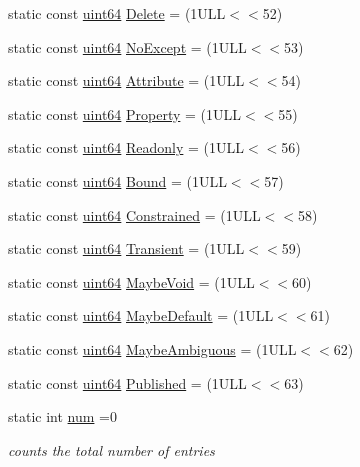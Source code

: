 \begin{DoxyCompactItemize}
\item 
static const \hyperlink{qglobal_8h_a29940ae63ec06c9998bba873e25407ad}{uint64} \hyperlink{class_entry_a7acc394a520d7dbc506a434baa11b2ff}{Delete} = (1\+U\+L\+L$<$$<$52)
\item 
static const \hyperlink{qglobal_8h_a29940ae63ec06c9998bba873e25407ad}{uint64} \hyperlink{class_entry_ac6b75896b4f2bda76dfc3c0a476af5c9}{No\+Except} = (1\+U\+L\+L$<$$<$53)
\item 
static const \hyperlink{qglobal_8h_a29940ae63ec06c9998bba873e25407ad}{uint64} \hyperlink{class_entry_a58fb43e4c3a836419285bdcc29302a80}{Attribute} = (1\+U\+L\+L$<$$<$54)
\item 
static const \hyperlink{qglobal_8h_a29940ae63ec06c9998bba873e25407ad}{uint64} \hyperlink{class_entry_a3f6eae37a5b311029176970ab0fdac14}{Property} = (1\+U\+L\+L$<$$<$55)
\item 
static const \hyperlink{qglobal_8h_a29940ae63ec06c9998bba873e25407ad}{uint64} \hyperlink{class_entry_a6560e43e64a7c5a4b579f6888c9f12f0}{Readonly} = (1\+U\+L\+L$<$$<$56)
\item 
static const \hyperlink{qglobal_8h_a29940ae63ec06c9998bba873e25407ad}{uint64} \hyperlink{class_entry_a34a5de5a4672f4fbcfd879dffc577f58}{Bound} = (1\+U\+L\+L$<$$<$57)
\item 
static const \hyperlink{qglobal_8h_a29940ae63ec06c9998bba873e25407ad}{uint64} \hyperlink{class_entry_a025979519b66924ba3cc1de357998f1f}{Constrained} = (1\+U\+L\+L$<$$<$58)
\item 
static const \hyperlink{qglobal_8h_a29940ae63ec06c9998bba873e25407ad}{uint64} \hyperlink{class_entry_a4002f093ccd2b3d3c78c443135757cee}{Transient} = (1\+U\+L\+L$<$$<$59)
\item 
static const \hyperlink{qglobal_8h_a29940ae63ec06c9998bba873e25407ad}{uint64} \hyperlink{class_entry_ac4db81b56383103198fda03a5bfe32f7}{Maybe\+Void} = (1\+U\+L\+L$<$$<$60)
\item 
static const \hyperlink{qglobal_8h_a29940ae63ec06c9998bba873e25407ad}{uint64} \hyperlink{class_entry_a7fd65cf61e33aa95cef95d5789f61063}{Maybe\+Default} = (1\+U\+L\+L$<$$<$61)
\item 
static const \hyperlink{qglobal_8h_a29940ae63ec06c9998bba873e25407ad}{uint64} \hyperlink{class_entry_ae3e84af12e322ab715e5ae191d92d1c7}{Maybe\+Ambiguous} = (1\+U\+L\+L$<$$<$62)
\item 
static const \hyperlink{qglobal_8h_a29940ae63ec06c9998bba873e25407ad}{uint64} \hyperlink{class_entry_a2dffe3090d7636a879832be07aec6a0a}{Published} = (1\+U\+L\+L$<$$<$63)
\item 
static int \hyperlink{class_entry_a11f13875c6f9f3f9bed32e97a5d50bf5}{num} =0
\begin{DoxyCompactList}\small\item\em counts the total number of entries \end{DoxyCompactList}\end{DoxyCompactItemize}


